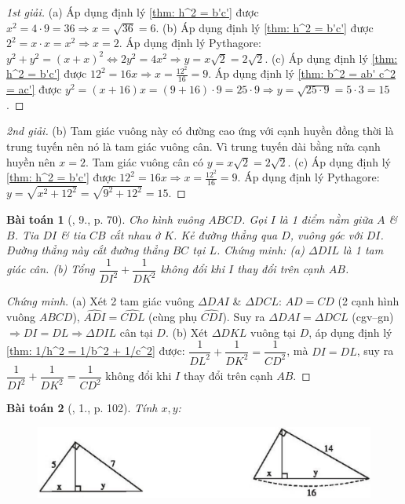 \documentclass{article}
\newtheorem{baitoan}{Bài toán}
\begin{document}
\begin{proof}[1st giải]
	(a) Áp dụng định lý \ref{thm: h^2 = b'c'} được $x^2 = 4\cdot9 = 36\Rightarrow x = \sqrt{36} = 6$. (b) Áp dụng định lý \ref{thm: h^2 = b'c'} được $2^2 = x\cdot x = x^2\Rightarrow x = 2$. Áp dụng định lý Pythagore: $y^2 + y^2 = (x + x)^2\Leftrightarrow 2y^2 = 4x^2\Rightarrow y = x\sqrt{2} = 2\sqrt{2}$. (c) Áp dụng định lý \ref{thm: h^2 = b'c'} được $12^2 = 16x\Rightarrow x = \frac{12^2}{16} = 9$. Áp dụng định lý \ref{thm: b^2 = ab' c^2 = ac'} được $y^2 = (x + 16)x = (9 + 16)\cdot9 = 25\cdot9\Rightarrow y = \sqrt{25\cdot9} = 5\cdot3 = 15$.
\end{proof}

\begin{proof}[2nd giải]
	(b) Tam giác vuông này có đường cao ứng với cạnh huyền đồng thời là trung tuyến nên nó là tam giác vuông cân. Vì trung tuyến dài bằng nửa cạnh huyền nên $x = 2$. Tam giác vuông cân có $y = x\sqrt{2} = 2\sqrt{2}$. (c) Áp dụng định lý \ref{thm: h^2 = b'c'} được $12^2 = 16x\Rightarrow x = \frac{12^2}{16} = 9$. Áp dụng định lý Pythagore: $y = \sqrt{x^2 + 12^2} = \sqrt{9^2 + 12^2} = 15$.
\end{proof}

\begin{baitoan}[\cite{SGK_Toan_9_tap_1}, 9., p. 70]
	Cho hình vuông $ABCD$. Gọi $I$ là 1 điểm nằm giữa $A$ \& $B$. Tia $DI$ \& tia $CB$ cắt nhau ở $K$. Kẻ đường thẳng qua $D$, vuông góc với $DI$. Đường thẳng này cắt đường thẳng $BC$ tại $L$. Chứng minh: (a) $\Delta DIL$ là 1 tam giác cân. (b) Tổng $\dfrac{1}{DI^2} + \dfrac{1}{DK^2}$ không đổi khi $I$ thay đổi trên cạnh $AB$.	
\end{baitoan}

\begin{proof}[Chứng minh]
	(a) Xét 2 tam giác vuông $\Delta DAI$ \& $\Delta DCL$: $AD = CD$ (2 cạnh hình vuông $ABCD$), $\widehat{ADI} = \widehat{CDL}$ (cùng phụ $\widehat{CDI}$). Suy ra $\Delta DAI = \Delta DCL$ (cgv--gn) $\Rightarrow DI = DL\Rightarrow\Delta DIL$ cân tại $D$. (b) Xét $\Delta DKL$ vuông tại $D$, áp dụng định lý \ref{thm: 1/h^2 = 1/b^2 + 1/c^2} được: $\dfrac{1}{DL^2} + \dfrac{1}{DK^2} = \dfrac{1}{CD^2}$, mà $DI = DL$, suy ra $\dfrac{1}{DI^2} + \dfrac{1}{DK^2} = \dfrac{1}{CD^2}$ không đổi khi $I$ thay đổi trên cạnh $AB$. 
\end{proof}

\begin{baitoan}[\cite{SBT_Toan_9_tap_1}, 1., p. 102]
	Tính $x,y$:
	\begin{figure}[H]
		\centering
		\includegraphics[scale=.25]{SBT_Toan_9_1_p102}
	\end{figure}
\end{baitoan}
\end{document}
